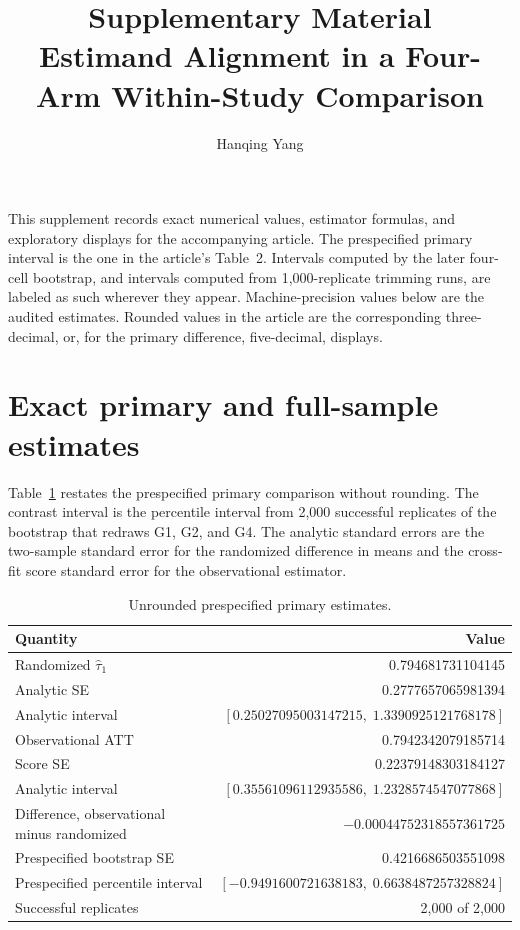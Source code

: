 \documentclass[11pt]{article}
\title{Supplementary Material\\
Estimand Alignment in a Four-Arm Within-Study Comparison}
\author{Hanqing Yang}
\date{}
\begin{document}
\maketitle

\noindent
This supplement records exact numerical values, estimator formulas, and exploratory displays for the accompanying article. The prespecified primary interval is the one in the article's Table~2. Intervals computed by the later four-cell bootstrap, and intervals computed from 1{,}000-replicate trimming runs, are labeled as such wherever they appear. Machine-precision values below are the audited estimates. Rounded values in the article are the corresponding three-decimal, or, for the primary difference, five-decimal, displays.

\section{Exact primary and full-sample estimates}
\label{sec:exact}

Table~\ref{tab:exact-primary} restates the prespecified primary comparison without rounding. The contrast interval is the percentile interval from 2{,}000 successful replicates of the bootstrap that redraws G1, G2, and G4. The analytic standard errors are the two-sample standard error for the randomized difference in means and the cross-fit score standard error for the observational estimator.

\begin{table}[ht]
\centering
\caption{Unrounded prespecified primary estimates.}
\label{tab:exact-primary}
\small
\begin{tabular}{lr}
\toprule
Quantity & Value \\
\midrule
Randomized $\widehat\tau_1$ & 0.794681731104145 \\
Analytic SE & 0.2777657065981394 \\
Analytic interval & $[0.25027095003147215,\; 1.3390925121768178]$ \\
Observational ATT & 0.7942342079185714 \\
Score SE & 0.22379148303184127 \\
Analytic interval & $[0.35561096112935586,\; 1.2328574547077868]$ \\
Difference, observational minus randomized & $-0.00044752318557361725$ \\
Prespecified bootstrap SE & 0.4216686503551098 \\
Prespecified percentile interval & $[-0.9491600721638183,\; 0.6638487257328824]$ \\
Successful replicates & 2{,}000 of 2{,}000 \\
\bottomrule
\end{tabular}
\end{table}
\end{document}
